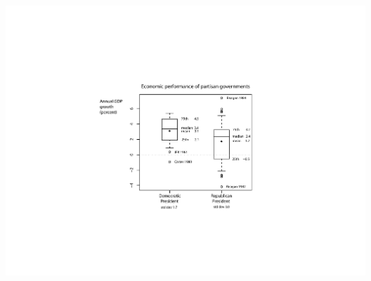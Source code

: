 \documentclass[pdflatex,landscape,titlepage]{foils}
\begin{document}
\begin{center}

\includegraphics[width=9 in]{gdpbox4}

\end{center}
\end{document}
